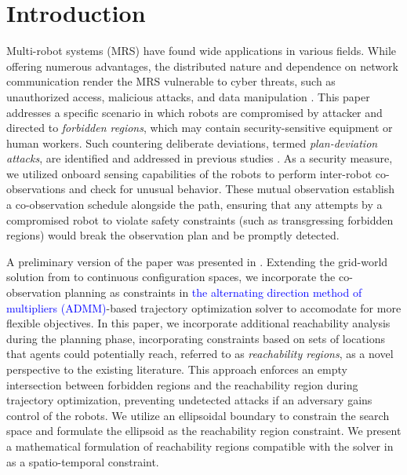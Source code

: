 \documentclass[10pt,twocolumn,twoside]{IEEEtran}
\newcommand{\new}[1]{\textcolor{blue}{#1}}
\begin{document}
\section{Introduction}\label{sec:introduction}
Multi-robot systems (MRS) have found wide applications in various fields. While offering numerous advantages, the distributed nature and dependence on network communication render the MRS vulnerable to cyber threats, such as unauthorized access, malicious attacks, and data manipulation \cite{brunner2010infiltrating}. This paper addresses a specific scenario in which  robots are compromised by attacker and directed to \emph{forbidden regions}, which may contain security-sensitive equipment or human workers. Such countering deliberate deviations, termed \emph{plan-deviation attacks}, are identified and addressed in previous studies \cite{wardega2019resilience, wardega2023byzantine, wardega2023hola, yang2021multi, yang2020multi}. As a security measure, we utilized onboard sensing capabilities of the robots to perform inter-robot co-observations and check for unusual behavior. These mutual observation establish a co-observation schedule alongside the path, ensuring that any attempts by a compromised robot to violate safety constraints (such as transgressing forbidden regions) would break the observation plan and be promptly detected.

A preliminary version of the paper was presented in \cite{yang2020multi,yang2021multi}. Extending the grid-world solution from \cite{wardega2019resilience} to continuous configuration spaces, we incorporate the co-observation planning as constraints in \new{the alternating direction method of multipliers (ADMM)}-based trajectory optimization solver to accomodate for more flexible objectives. In this paper, we incorporate additional reachability analysis during the planning phase, incorporating constraints based on sets of locations that agents could potentially reach, referred to as \emph{reachability regions}, as a novel perspective to the existing literature. This approach enforces an empty intersection between forbidden regions and the reachability region during trajectory optimization, preventing undetected attacks if an adversary gains control of the robots. We utilize an ellipsoidal boundary to constrain the search space and formulate the ellipsoid as the reachability region constraint. We present a mathematical formulation of reachability regions compatible with the solver in \cite{yang2020multi} as a spatio-temporal constraint. 
\end{document}
